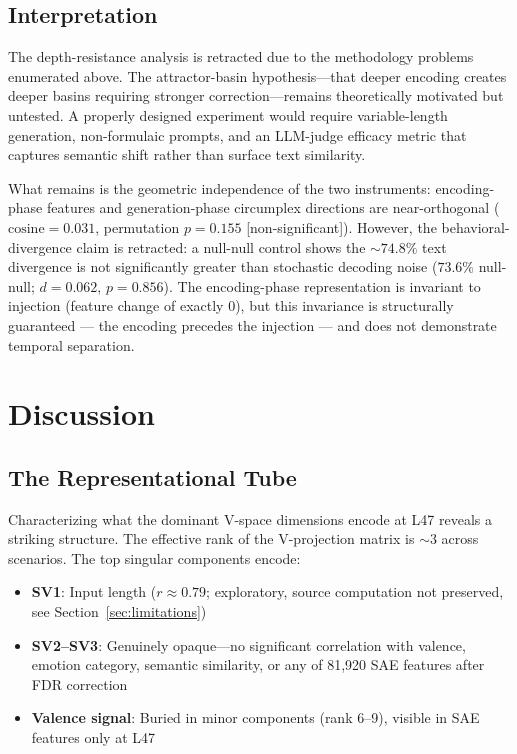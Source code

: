 \documentclass[11pt,a4paper]{article}
\begin{document}
\subsection{Interpretation}

The depth-resistance analysis is retracted due to the methodology problems
enumerated above. The attractor-basin hypothesis---that deeper encoding
creates deeper basins requiring stronger correction---remains theoretically
motivated but untested. A properly designed experiment would require
variable-length generation, non-formulaic prompts, and an LLM-judge
efficacy metric that captures semantic shift rather than surface text
similarity.

What remains is the geometric independence of the two instruments:
encoding-phase features and generation-phase circumplex directions are
near-orthogonal ($\text{cosine}{=}0.031$, permutation $p{=}0.155$
[non-significant]). However, the behavioral-divergence claim is
retracted: a null-null control shows the ${\sim}74.8\%$ text divergence is
not significantly greater than stochastic decoding noise ($73.6\%$
null-null; $d{=}0.062$, $p{=}0.856$).
The encoding-phase representation is invariant to injection
(feature change of exactly $0$), but this invariance is structurally
guaranteed --- the encoding precedes the injection --- and does not
demonstrate temporal separation.

\section{Discussion}
\label{sec:discussion}

\subsection{The Representational Tube}

Characterizing what the dominant V-space dimensions encode at L47 reveals
a striking structure. The effective rank of the V-projection matrix is
$\sim$3 across scenarios. The top singular components encode:

\begin{itemize}[nosep]
  \item \textbf{SV1}: Input length ($r{\approx}0.79$; exploratory, source computation not preserved, see Section~\ref{sec:limitations})
  \item \textbf{SV2--SV3}: Genuinely opaque---no significant correlation
    with valence, emotion category, semantic similarity, or any of 81,920
    SAE features after FDR correction
  \item \textbf{Valence signal}: Buried in minor components (rank 6--9),
    visible in SAE features only at L47
\end{itemize}
\end{document}
